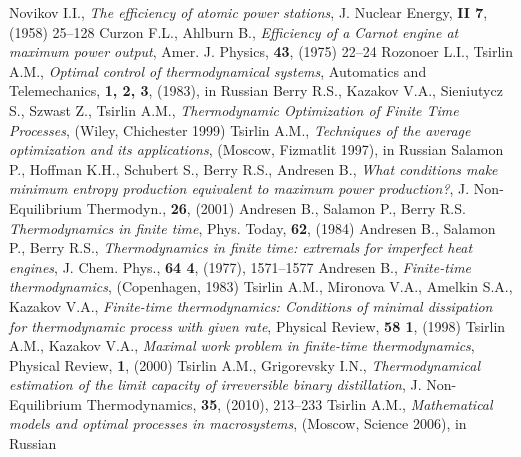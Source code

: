 \documentclass[epjST]{svjour}
\begin{document}
%
\begin{thebibliography}{}
Novikov I.I., \textit{The efficiency of atomic power stations}, J. Nuclear Energy, \textbf{II 7}, (1958) 25--128
Curzon F.L., Ahlburn B., \textit{Efficiency of a Carnot engine at maximum power output}, Amer. J. Physics, \textbf{43}, (1975) 22--24
Rozonoer L.I., Tsirlin A.M., \textit{Optimal control of thermodynamical systems}, Automatics and Telemechanics, \textbf{1, 2, 3}, (1983), in Russian
Berry R.S., Kazakov V.A., Sieniutycz S., Szwast Z., Tsirlin A.M., \textit{Thermodynamic Optimization of Finite Time Processes}, (Wiley, Chichester 1999)
Tsirlin A.M., \textit{Techniques of the average optimization and its applications}, (Moscow, Fizmatlit 1997), in Russian
Salamon P., Hoffman K.H., Schubert S., Berry R.S., Andresen B., \textit{What conditions make minimum entropy production equivalent to maximum power production?}, J. Non-Equilibrium Thermodyn., \textbf{26}, (2001)
Andresen B., Salamon P., Berry R.S. \textit{Thermodynamics in finite time}, Phys. Today, \textbf{62}, (1984)
Andresen B., Salamon P., Berry R.S., \textit{Thermodynamics in finite time: extremals for imperfect heat engines}, J. Chem. Phys., \textbf{64 4}, (1977), 1571--1577
Andresen B., \textit{Finite-time thermodynamics}, (Copenhagen, 1983)
Tsirlin A.M., Mironova V.A., Amelkin S.A., Kazakov V.A., \textit{Finite-time thermodynamics: Conditions of minimal dissipation for thermodynamic process with given rate}, Physical Review, \textbf{58 1}, (1998)
Tsirlin A.M., Kazakov V.A., \textit{Maximal work problem in finite-time thermodynamics}, Physical Review, \textbf{1}, (2000)
Tsirlin A.M., Grigorevsky I.N., \textit{Thermodynamical estimation of the limit capacity of irreversible binary distillation}, J. Non-Equilibrium Thermodynamics, \textbf{35}, (2010), 213--233
Tsirlin A.M., \textit{Mathematical models and optimal processes in macrosystems}, (Moscow, Science 2006), in Russian

\end{thebibliography}
\end{document}
